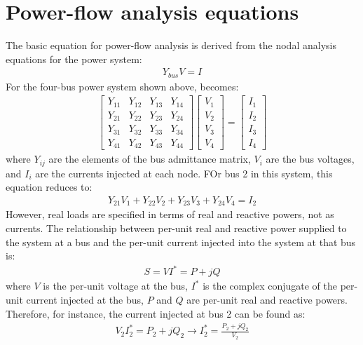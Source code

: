 \section{Power-flow analysis equations}
The basic equation for power-flow analysis is derived from the nodal analysis equations for the power system:
\begin{gather}
	Y_{bus}V = I
\end{gather}
For the four-bus power system shown above, becomes:
\begin{gather}
	\begin{bmatrix}
		Y_{11} & Y_{12} & Y_{13} & Y_{14} \\
		Y_{21} & Y_{22} & Y_{23} & Y_{24} \\
		Y_{31} & Y_{32} & Y_{33} & Y_{34} \\
		Y_{41} & Y_{42} & Y_{43} & Y_{44}
	\end{bmatrix} \begin{bmatrix}
		V_1 \\
		V_2 \\
		V_3 \\
		V_4
	\end{bmatrix}=\begin{bmatrix}
		I_1 \\
		I_2 \\
		I_3 \\
		I_4
	\end{bmatrix}
\end{gather}
where $Y_{ij}$ are the elements of the bus admittance matrix, $V_i$ are the bus voltages, and $I_i$ are the currents injected at each node. FOr bus 2 in this system, this equation reduces to:
\begin{gather}
	Y_{21}V_1 + Y_{22}V_2 + Y_{23}V_3 + Y_{24}V_4 = I_2
\end{gather}
However, real loads are specified in terms of real and reactive powers, not as currents. The relationship between per-unit real and reactive power supplied to the system at a bus and the per-unit current injected into the system at that bus is:
\begin{gather}
	S = VI^* = P+jQ
\end{gather}
where $V$ is the per-unit voltage at the bus, $I^*$ is the complex conjugate of the per-unit current injected at the bus, $P$ and $Q$ are per-unit real and reactive powers. Therefore, for instance, the current injected at bus 2 can be found as:
\begin{gather}
	V_2 I^*_2 = P_2 + jQ_2 \rightarrow I^*_2 = \frac{P_2 + jQ_2}{V_2}
\end{gather}
